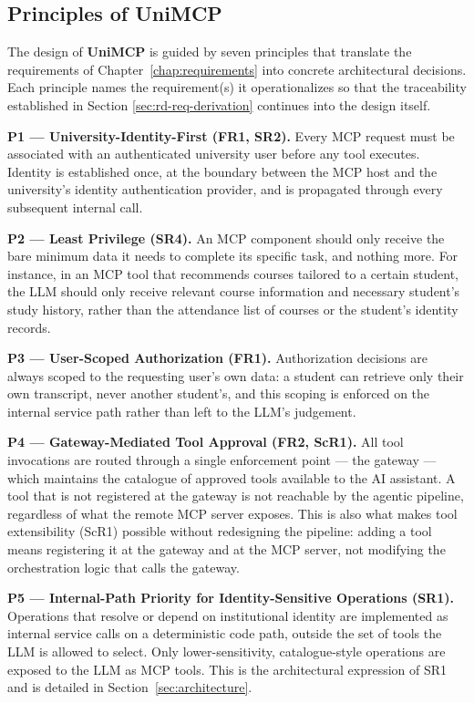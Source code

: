 \documentclass[english, 12pt, a4paper, elec, utf8, a-2b, online]{aaltothesis}
\newcommand{\UniMCP}{\textbf{UniMCP}\xspace}
\begin{document}
\subsection{Principles of \UniMCP}
\label{sec:principles}
The design of \UniMCP is guided by seven principles that translate the requirements of Chapter~\ref{chap:requirements} into concrete architectural decisions. 
Each principle names the requirement(s) it operationalizes so that the traceability established in Section \ref{sec:rd-req-derivation} continues into the design itself.
 
\textbf{P1 --- University-Identity-First (FR1, SR2).}
Every MCP request must be associated with an authenticated university user before any tool executes.
Identity is established once, at the boundary between the MCP host and the university's identity authentication provider, and is propagated through every subsequent internal call.
 
\textbf{P2 --- Least Privilege (SR4).}
An MCP component should only receive the  bare minimum data it needs to complete its specific task, and nothing more. 
For instance, in an MCP tool that recommends courses tailored to a certain student, the LLM should only receive relevant course information and necessary student's study history, rather than the attendance list of courses or the student's identity records.
 
\textbf{P3 --- User-Scoped Authorization (FR1).}
Authorization decisions are always scoped to the requesting user's own data: a student can retrieve
only their own transcript, never another student's, and this scoping is enforced on the internal
service path rather than left to the LLM's judgement.
 
\textbf{P4 --- Gateway-Mediated Tool Approval (FR2, ScR1).}
All tool invocations are routed through a single enforcement point --- the gateway --- which maintains the catalogue of approved tools available to the AI assistant. 
A tool that is not registered at the gateway is not reachable by the agentic pipeline, regardless of what the remote MCP server exposes. 
This is also what makes tool extensibility (ScR1) possible without redesigning the pipeline: adding a tool means registering it at the gateway and at the MCP server, not modifying the
orchestration logic that calls the gateway.
 
\textbf{P5 --- Internal-Path Priority for Identity-Sensitive Operations (SR1).}
Operations that resolve or depend on institutional identity are implemented as internal service
calls on a deterministic code path, outside the set of tools the LLM is allowed to select. Only
lower-sensitivity, catalogue-style operations are exposed to the LLM as MCP tools. This is the
architectural expression of SR1 and is detailed in Section~\ref{sec:architecture}.
 
\end{document}
